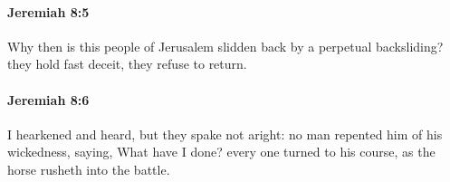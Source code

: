 		\paragraph{Jeremiah 8:5} %
			\label{JEREMIAH-8-5}

			Why then is this people of Jerusalem slidden back by a perpetual backsliding? they hold fast deceit, they refuse to return.


		\paragraph{Jeremiah 8:6} %
			\label{JEREMIAH-8-6}

			I hearkened and heard, but they spake not aright: no man repented him of his wickedness, saying, What have I done? every one turned to his course, as the horse rusheth into the battle.


